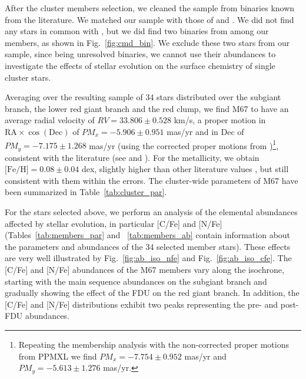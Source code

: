 \documentclass[a4paper,fleqn,usenatbib]{mnras}
\begin{document}
After the cluster members selection, we cleaned the sample from binaries known from the literature. We matched our sample with those of \citet{yakut2009}  and \citet{geller2015}. We did not find any stars in common with \citet{yakut2009}, but we did find two binaries from \citet{geller2015} among our members, as shown in Fig.~\ref{fig:cmd_bin}. We exclude these two stars from our sample, since being unresolved binaries, we cannot use their abundances to investigate the effects of stellar evolution on the surface chemistry of single cluster stars.

Averaging over the resulting sample of 34 stars distributed over the subgiant branch, the lower red giant branch and the red clump, we find M67 to have an average radial velocity of $RV=33.806\pm0.528$ km/s, a proper motion in $\text{RA}\times\cos(\text{Dec})$ of $PM_x=-5.906\pm0.951$ mas/yr and in Dec of $PM_y=-7.175\pm1.268$ mas/yr (using the corrected proper motions from \citealt{vickers2016})\footnote{Repeating the membership analysis with the non-corrected proper motions from PPMXL we find $PM_x=-7.754\pm0.952$ mas/yr and $PM_y=-5.613\pm1.276$ mas/yr.}, consistent with the literature (see \citealt{yadav2008,geller2015} and \citealt{bellini2010b}). For the metallicity, we obtain $\text{[Fe/H]}=0.08\pm0.04$ dex, slightly higher than other literature values \citep[see, e.g.,][]{tautv2000,shetrone2000,yong2005,randich2006,pace2008,onehag2014}, but still consistent with them within the errors. The cluster-wide parameters of M67 have been summarized in Table~\ref{tab:cluster_par}.

For the stars selected above, we perform an analysis of the elemental abundances affected by stellar evolution, in particular [C/Fe] and [N/Fe] (Tables~\ref{tab:members_par} and ~\ref{tab:members_ab} contain information about the parameters and abundances of the 34 selected member stars). These effects are very well illustrated by Fig.~\ref{fig:ab_iso_nfe} and Fig.~\ref{fig:ab_iso_cfe}. The [C/Fe] and [N/Fe] abundances of the M67 members vary along the isochrone, starting with the main sequence abundances on the subgiant branch and gradually showing the effect of the FDU on the red giant branch. In addition, the [C/Fe] and [N/Fe] distributions exhibit two peaks representing the pre- and post-FDU abundances.
\end{document}
